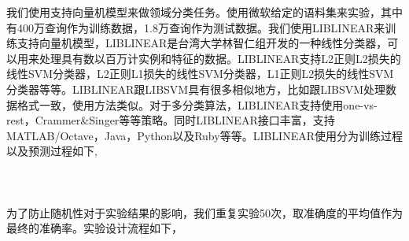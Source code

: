 \documentclass[master]{njuthesis}
\begin{document}
    我们使用支持向量机模型来做领域分类任务。使用微软给定的语料集来实验，其中有400万查询作为训练数据，1.8万查询作为测试数据。我们使用LIBLINEAR\cite{LibLinear}来训练支持向量机模型，LIBLINEAR是台湾大学林智仁组开发的一种线性分类器，可以用来处理具有数以百万计实例和特征的数据。LIBLINEAR支持L2正则L2损失的线性SVM分类器，L2正则L1损失的线性SVM分类器，L1正则L2损失的线性SVM分类器等等。LIBLINEAR跟LIBSVM具有很多相似地方，比如跟LIBSVM处理数据格式一致，使用方法类似。对于多分类算法，LIBLINEAR支持使用one-vs-rest，Crammer\&Singer等等策略。同时LIBLINEAR接口丰富，支持MATLAB/Octave，Java，Python以及Ruby等等。LIBLINEAR使用分为训练过程以及预测过程如下,\\
\\
\\
\\  
     为了防止随机性对于实验结果的影响，我们重复实验50次，取准确度的平均值作为最终的准确率。实验设计流程如下，\\
\\
\end{document}
